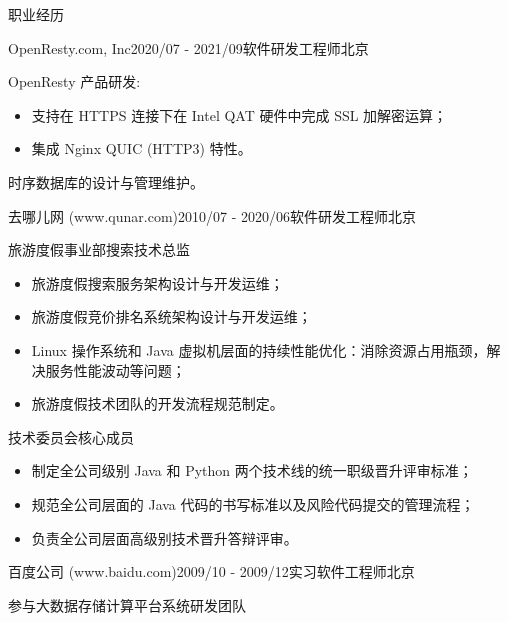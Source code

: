 \documentclass{resume} %
\begin{document}
\begin{rSection}{职业经历}

  \begin{rSubsection}{OpenResty.com, Inc}{2020/07 - 2021/09}{软件研发工程师}{北京}
  \item OpenResty 产品研发:
    \begin {itemize}
    \item 支持在 HTTPS 连接下在 Intel QAT 硬件中完成 SSL 加解密运算；
    \item 集成 Nginx QUIC (HTTP3) 特性。
    \end{itemize}
  \item 时序数据库的设计与管理维护。
  \end{rSubsection}

  \begin{rSubsection}{去哪儿网 (www.qunar.com)}{2010/07 - 2020/06}{软件研发工程师}{北京}

  \item 旅游度假事业部搜索技术总监
    \begin{itemize}
    \item 旅游度假搜索服务架构设计与开发运维；
    \item 旅游度假竞价排名系统架构设计与开发运维；
    \item Linux 操作系统和 Java 虚拟机层面的持续性能优化：消除资源占用瓶颈，解决服务性能波动等问题；
    \item 旅游度假技术团队的开发流程规范制定。
    \end{itemize}
  \item 技术委员会核心成员
    \begin{itemize}
    \item 制定全公司级别 Java 和 Python 两个技术线的统一职级晋升评审标准；
    \item 规范全公司层面的 Java 代码的书写标准以及风险代码提交的管理流程；
    \item 负责全公司层面高级别技术晋升答辩评审。
    \end{itemize}
    
  \end{rSubsection}


  \begin{rSubsection}{百度公司 (www.baidu.com)}{2009/10 - 2009/12}{实习软件工程师}{北京}
  \item 参与大数据存储计算平台系统研发团队
  \end{rSubsection}

\end{rSection}
\end{document}
